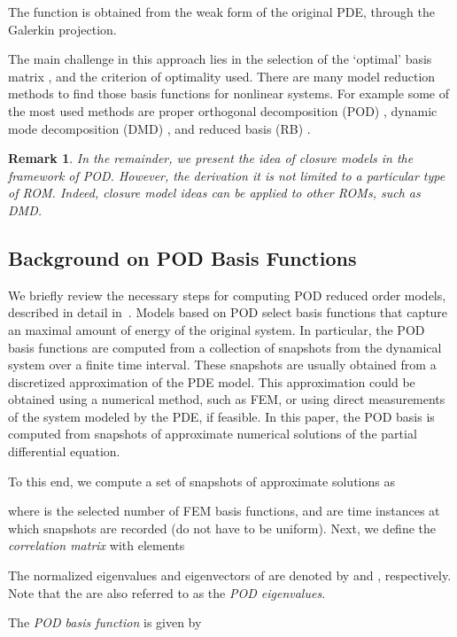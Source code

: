 \documentclass[letterpaper,conference,onecolumn,11pt]{IEEEtran}
\newtheorem{remark}{Remark}
\begin{document}
The function  is obtained
from the weak form of the original PDE, through the Galerkin
projection.

The main challenge in this approach lies in the selection of the
`optimal' basis matrix , and the criterion of optimality
used. There are many model reduction methods to find those basis
functions for nonlinear systems. For example some of the most used
methods are proper orthogonal decomposition (POD) \cite{KV02}, dynamic
mode decomposition (DMD) \cite{KGBBN15}, and reduced basis (RB)
\cite{veroy2005certified}.

\begin{remark}
    In the remainder, we present the idea of closure models in the
    framework of POD. However, the derivation it is not limited to a
    particular type of ROM. Indeed, closure model ideas can be applied
    to other ROMs, such as DMD.
\end{remark}


\subsection{Background on POD Basis Functions}
\label{basic_pod_chap3}
We briefly review the necessary steps for computing POD reduced order
models, described in detail in~\cite{KV02,HLB98}. Models based on POD
select basis functions that capture an maximal amount of energy of the
original system. In particular, the POD basis functions are computed
from a collection of snapshots from the dynamical system over a finite
time interval. These snapshots are usually obtained from a discretized
approximation of the PDE model. This approximation could be obtained
using a numerical method, such as FEM, or using direct measurements of
the system modeled by the PDE, if feasible. In this paper, the POD
basis is computed from snapshots of approximate numerical solutions of
the partial differential equation.

To this end, we compute a set of  snapshots of approximate
solutions as

where  is the selected number of FEM basis functions, and  are
time instances at which snapshots are recorded (do not have to be
uniform). Next, we define the \textit{correlation matrix}  with
elements

The normalized eigenvalues and eigenvectors of  are denoted by
 and , respectively. Note that the  are
also referred to as the \textit{POD eigenvalues}.

The  \textit{POD basis function} is given by
\end{document}
